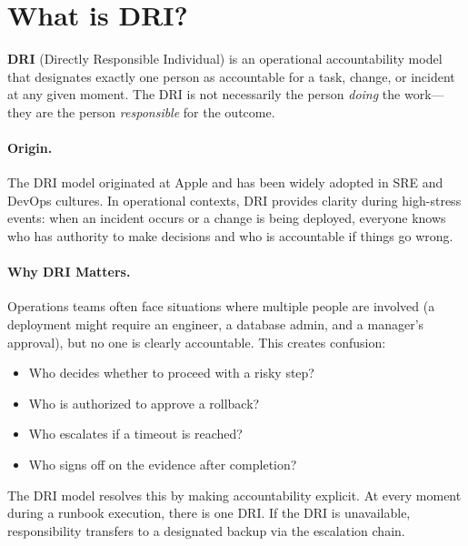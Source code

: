 \section{What is DRI?}

\textbf{DRI} (Directly Responsible Individual) is an operational accountability model that designates exactly one person as accountable for a task, change, or incident at any given moment. The DRI is not necessarily the person \emph{doing} the work---they are the person \emph{responsible} for the outcome.

\paragraph{Origin.}
The DRI model originated at Apple and has been widely adopted in SRE and DevOps cultures. In operational contexts, DRI provides clarity during high-stress events: when an incident occurs or a change is being deployed, everyone knows who has authority to make decisions and who is accountable if things go wrong.

\paragraph{Why DRI Matters.}
Operations teams often face situations where multiple people are involved (a deployment might require an engineer, a database admin, and a manager's approval), but no one is clearly accountable. This creates confusion:
\begin{itemize}
  \item Who decides whether to proceed with a risky step?
  \item Who is authorized to approve a rollback?
  \item Who escalates if a timeout is reached?
  \item Who signs off on the evidence after completion?
\end{itemize}

The DRI model resolves this by making accountability explicit. At every moment during a runbook execution, there is one DRI. If the DRI is unavailable, responsibility transfers to a designated backup via the escalation chain.

